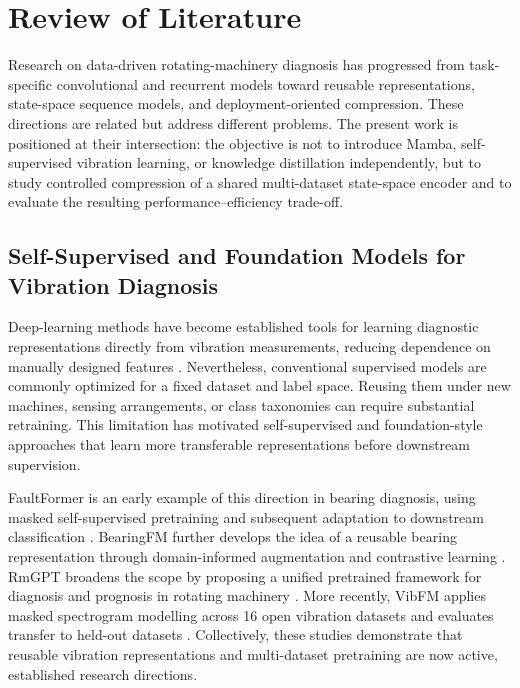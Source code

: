 \section{Review of Literature}
\label{sec:literature}

Research on data-driven rotating-machinery diagnosis has progressed from task-specific convolutional and recurrent models toward reusable representations, state-space sequence models, and deployment-oriented compression. These directions are related but address different problems. The present work is positioned at their intersection: the objective is not to introduce Mamba, self-supervised vibration learning, or knowledge distillation independently, but to study controlled compression of a shared multi-dataset state-space encoder and to evaluate the resulting performance--efficiency trade-off.

\subsection{Self-Supervised and Foundation Models for Vibration Diagnosis}
\label{subsec:foundation}

Deep-learning methods have become established tools for learning diagnostic representations directly from vibration measurements, reducing dependence on manually designed features \citep{Zhao2019DLHealth,Souza2021RotatingDL}. Nevertheless, conventional supervised models are commonly optimized for a fixed dataset and label space. Reusing them under new machines, sensing arrangements, or class taxonomies can require substantial retraining. This limitation has motivated self-supervised and foundation-style approaches that learn more transferable representations before downstream supervision.

FaultFormer is an early example of this direction in bearing diagnosis, using masked self-supervised pretraining and subsequent adaptation to downstream classification \citep{Zhou2024FaultFormer}. BearingFM further develops the idea of a reusable bearing representation through domain-informed augmentation and contrastive learning \citep{Lai2024BearingFM}. RmGPT broadens the scope by proposing a unified pretrained framework for diagnosis and prognosis in rotating machinery \citep{Wang2025RmGPT}. More recently, VibFM applies masked spectrogram modelling across 16 open vibration datasets and evaluates transfer to held-out datasets \citep{Mannone2026VibFM}. Collectively, these studies demonstrate that reusable vibration representations and multi-dataset pretraining are now active, established research directions.

